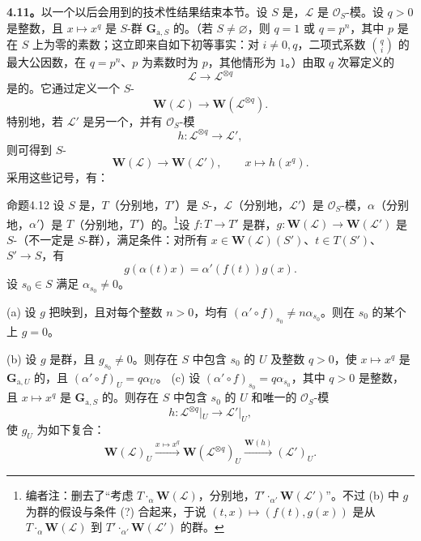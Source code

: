 \textbf{4.11。}以一个以后会用到的技术性结果结束本节。设 $S$ 是，$\mathscr L$ 是 $\mathscr O_S$-模。设 $q>0$ 是整数，且 $x\mapsto x^q$ 是 $S$-群 $\mathbf G_{\mathrm a,S}$ 的。（若 $S\ne\varnothing$，则 $q=1$ 或 $q=p^n$，其中 $p$ 是在 $S$ 上为零的素数；这立即来自如下初等事实：对 $i\ne0,q$，二项式系数 $\binom qi$ 的最大公因数，在 $q=p^n$、$p$ 为素数时为 $p$，其他情形为 $1$。）由取 $q$ 次幂定义的
\[
\mathscr L\longrightarrow\mathscr L^{\otimes q}
\]
是的。它通过定义一个 $S$-
\[
\mathbf W(\mathscr L)\longrightarrow\mathbf W(\mathscr L^{\otimes q}).
\]
特别地，若 $\mathscr L'$ 是另一个，并有 $\mathscr O_S$-模
\[
h:\mathscr L^{\otimes q}\longrightarrow\mathscr L',
\]
则可得到 $S$-
\[
\mathbf W(\mathscr L)\longrightarrow\mathbf W(\mathscr L'),\qquad x\longmapsto h(x^q).
\]
采用这些记号，有：
\begin{SGAresult}{命题}{4.12}
设 $S$ 是，$T$（分别地，$T'$）是 $S$-，$\mathscr L$（分别地，$\mathscr L'$）是 $\mathscr O_S$-模，$\alpha$（分别地，$\alpha'$）是 $T$（分别地，$T'$）的。\footnote[36]{编者注：删去了“考虑 $T\cdot_\alpha\mathbf W(\mathscr L)$，分别地，$T'\cdot_{\alpha'}\mathbf W(\mathscr L')$”。不过 (b) 中 $g$ 为群的假设与条件 (?) 合起来，于说 $(t,x)\mapsto(f(t),g(x))$ 是从 $T\cdot_\alpha\mathbf W(\mathscr L)$ 到 $T'\cdot_{\alpha'}\mathbf W(\mathscr L')$ 的群。}设 $f:T\to T'$ 是群，$g:\mathbf W(\mathscr L)\to\mathbf W(\mathscr L')$ 是 $S$-（不一定是 $S$-群），满足条件：对所有 $x\in\mathbf W(\mathscr L)(S')$、$t\in T(S')$、$S'\to S$，有
\begin{equation}
g(\alpha(t)x)=\alpha'(f(t))g(x).\tag{?}
\end{equation}
设 $s_0\in S$ 满足 $\alpha_{s_0}\ne0$。

(a) 设 $g$ 把映到，且对每个整数 $n>0$，均有 $(\alpha'\circ f)_{s_0}\ne n\alpha_{s_0}$。则在 $s_0$ 的某个上 $g=0$。

(b) 设 $g$ 是群，且 $g_{s_0}\ne0$。则存在 $S$ 中包含 $s_0$ 的 $U$ 及整数 $q>0$，使 $x\mapsto x^q$ 是 $\mathbf G_{\mathrm a,U}$ 的，且 $(\alpha'\circ f)_U=q\alpha_U$。
(c) 设 $(\alpha'\circ f)_{s_0}=q\alpha_{s_0}$，其中 $q>0$ 是整数，且 $x\mapsto x^q$ 是 $\mathbf G_{\mathrm a,S}$ 的。则存在 $S$ 中包含 $s_0$ 的 $U$ 和唯一的 $\mathscr O_S$-模
\[
h:\mathscr L^{\otimes q}|_U\longrightarrow\mathscr L'|_U,
\]
使 $g_U$ 为如下复合：
\[
\mathbf W(\mathscr L)_U\xrightarrow{x\mapsto x^q}\mathbf W(\mathscr L^{\otimes q})_U\xrightarrow{\mathbf W(h)}(\mathscr L')_U.
\]
\end{SGAresult}

